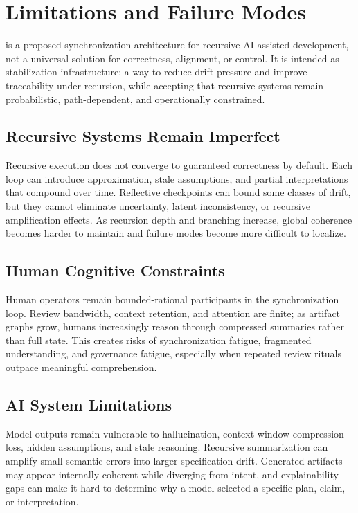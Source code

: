 \section{Limitations and Failure Modes}
\label{sec:limitations}

 is a proposed synchronization architecture for recursive AI-assisted development, not a universal solution for correctness, alignment, or control. It is intended as stabilization infrastructure: a way to reduce drift pressure and improve traceability under recursion, while accepting that recursive systems remain probabilistic, path-dependent, and operationally constrained.

\subsection{Recursive Systems Remain Imperfect}

Recursive execution does not converge to guaranteed correctness by default. Each loop can introduce approximation, stale assumptions, and partial interpretations that compound over time. Reflective checkpoints can bound some classes of drift, but they cannot eliminate uncertainty, latent inconsistency, or recursive amplification effects. As recursion depth and branching increase, global coherence becomes harder to maintain and failure modes become more difficult to localize.

\subsection{Human Cognitive Constraints}

Human operators remain bounded-rational participants in the synchronization loop. Review bandwidth, context retention, and attention are finite; as artifact graphs grow, humans increasingly reason through compressed summaries rather than full state. This creates risks of synchronization fatigue, fragmented understanding, and governance fatigue, especially when repeated review rituals outpace meaningful comprehension.

\subsection{AI System Limitations}

Model outputs remain vulnerable to hallucination, context-window compression loss, hidden assumptions, and stale reasoning. Recursive summarization can amplify small semantic errors into larger specification drift. Generated artifacts may appear internally coherent while diverging from intent, and explainability gaps can make it hard to determine why a model selected a specific plan, claim, or interpretation.

